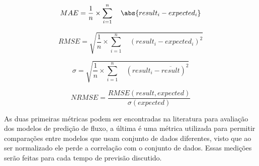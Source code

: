 \begin{equation}
MAE = \frac{1}{n} \times \sum_{i=1}^{n} \quad \abs{result_i - expected_i}
\end{equation}

\begin{equation}
RMSE = \sqrt{ \frac{1}{n} \times \sum_{i=1}^{n} \quad (result_i - expected_i) ^ 2}
\end{equation}

\begin{equation}
\sigma = \sqrt{ \frac{1}{n} \times \sum_{i=1}^{n} \quad (result_i - \overline{result}) ^ 2}
\end{equation}

\begin{equation}
NRMSE = \frac{RMSE(result, expected)}{\sigma(expected)}
\end{equation}

As duas primeiras métricas podem ser encontradas na literatura para avaliação dos modelos de predição de fluxo, a última é uma métrica utilizada para permitir comparações entre modelos que usam conjunto de dados diferentes, visto que ao ser normalizado ele perde a correlação com o conjunto de dados. Essas medições serão feitas para cada tempo de previsão discutido.

